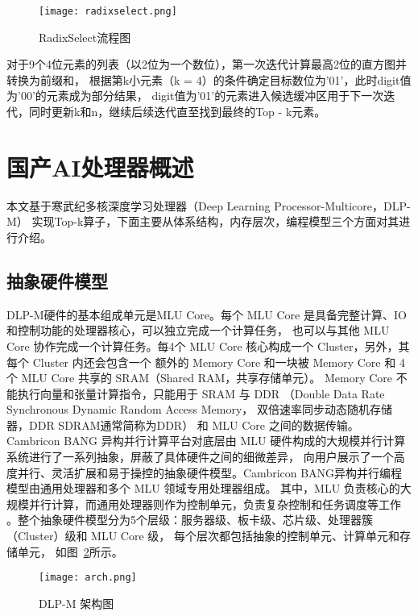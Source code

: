 \begin{figure}[ht]
    \centering
    \texttt{[image: radixselect.png]}
    \caption{RadixSelect流程图}
    \label{fig:radixselect}
\end{figure}

对于9个4位元素的列表（以2位为一个数位），第一次迭代计算最高2位的直方图并转换为前缀和，
根据第k小元素（k = 4）的条件确定目标数位为'01'，此时digit值为'00'的元素成为部分结果，
digit值为'01'的元素进入候选缓冲区用于下一次迭代，同时更新k和n，继续后续迭代直至找到最终的Top - k元素。




\section{国产AI处理器概述}
本文基于寒武纪多核深度学习处理器（Deep Learning Processor-Multicore，DLP-M）
实现Top-k算子，下面主要从体系结构，内存层次，编程模型三个方面对其进行介绍。
\subsection{抽象硬件模型}
DLP-M硬件的基本组成单元是MLU Core。每个 MLU Core 是具备完整计算、IO和控制功能的处理器核心，可以独立完成一个计算任务，
也可以与其他 MLU Core 协作完成一个计算任务。每4个 MLU Core 核心构成一个 Cluster，另外，其每个 Cluster 内还会包含一个
额外的 Memory Core 和一块被 Memory Core 和 4 个 MLU Core 共享的 SRAM（Shared RAM，共享存储单元）。
Memory Core 不能执行向量和张量计算指令，只能用于 SRAM 与 DDR （Double Data Rate Synchronous Dynamic Random Access Memory，
双倍速率同步动态随机存储器，DDR SDRAM通常简称为DDR） 和 MLU Core 之间的数据传输。
Cambricon BANG 异构并行计算平台对底层由 MLU 硬件构成的大规模并行计算系统进行了一系列抽象，屏蔽了具体硬件之间的细微差异，
向用户展示了一个高度并行、灵活扩展和易于操控的抽象硬件模型。Cambricon BANG异构并行编程模型由通用处理器和多个 MLU 领域专用处理器组成。
其中，MLU 负责核心的大规模并行计算，而通用处理器则作为控制单元，负责复杂控制和任务调度等工作
。整个抽象硬件模型分为5个层级：服务器级、板卡级、芯片级、处理器簇（Cluster）级和 MLU Core 级，
每个层次都包括抽象的控制单元、计算单元和存储单元，
如图~\ref{fig:arch}所示。
\begin{figure}[ht]
    \centering
    \texttt{[image: arch.png]}
    \caption{DLP-M 架构图}
    \label{fig:arch}
    \note{}
  \end{figure}

